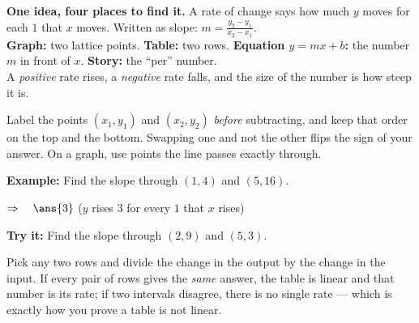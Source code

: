 \documentclass[12pt]{article}
\begin{document}

\begin{formulabox}
\textbf{One idea, four places to find it.} A rate of change says how much $y$
moves for each $1$ that $x$ moves. Written as slope:
$m = \frac{y_2 - y_1}{x_2 - x_1}$.\\[3pt]
\textbf{Graph:} two lattice points. \quad \textbf{Table:} two rows. \quad
\textbf{Equation $y = mx + b$:} the number $m$ in front of $x$. \quad
\textbf{Story:} the ``per'' number.\\[3pt]
A \emph{positive} rate rises, a \emph{negative} rate falls, and the size of the
number is how steep it is.
\end{formulabox}


\begin{formulabox}
Label the points $(x_1, y_1)$ and $(x_2, y_2)$ \emph{before} subtracting, and
keep that order on the top and the bottom. Swapping one and not the other flips
the sign of your answer. On a graph, use points the line passes exactly
through.
\end{formulabox}

\begin{examplebox}
\textbf{Example:} \quad Find the slope through $(1, 4)$ and $(5, 16)$.

$\Rightarrow\quad \ans{3}$ \quad ($y$ rises $3$ for every $1$ that $x$ rises)
\end{examplebox}

\begin{tryitbox}
\textbf{Try it:} \quad Find the slope through $(2, 9)$ and $(5, 3)$.\\[2pt]
\end{tryitbox}


\begin{formulabox}
Pick any two rows and divide the change in the output by the change in the
input. If every pair of rows gives the \emph{same} answer, the table is linear
and that number is its rate; if two intervals disagree, there is no single
rate --- which is exactly how you prove a table is not linear.
\end{formulabox}
\end{document}
